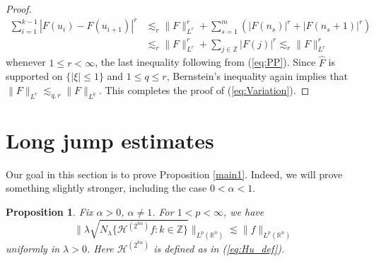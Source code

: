 \documentclass[12pt,leqno]{amsart}
\def\R{\mathbb{R}}
\def\Z{\mathbb{Z}}
\theoremstyle{plain}
\newtheorem{prop}[thm]{Proposition}
\numberwithin{equation}{section}
\begin{document}
\begin{proof}
\begin{align*}
\sum_{i=1}^{k-1} |F(u_i)-F(u_{i+1})|^r 
&\lesssim_r \|F\|_{L^r}^r + \sum_{s = 1}^m \left( |F(n_s)|^r + |F(n_s+1)|^r \right)  \\
&\lesssim_r \|F\|_{L^r}^r + \sum_{j \in \Z} |F(j)|^r \lesssim_r \|F\|_{L^r}^r
\end{align*}
whenever $1 \leq r < \infty$, the last inequality following from (\ref{eq:PP}). Since $\widehat{F}$ is supported on $\{|\xi| \leq 1\}$ and $1 \leq q \leq r$, Bernstein's inequality again implies that $\|F\|_{L^r} \lesssim_{q,r} \|F\|_{L^q}$. This completes the proof of (\ref{eq:Variation}). 
\end{proof}





\section{Long jump estimates}\label{section:long-jumps}

Our goal in this section is to prove Proposition \ref{main1}. Indeed, we will prove something slightly stronger, including the case $0<\alpha<1$.

\begin{prop}
Fix $\alpha > 0$, $\alpha \ne 1$. For $1 < p < \infty$, we have
\begin{equation} \label{eq:Hk_jump}
\| \lambda \sqrt{N_{\lambda} \{\mathcal{H}^{(2^{k\alpha})} f \colon k \in \Z\} } \|_{L^p(\R^n)} \lesssim \|f\|_{L^p(\R^n)}
\end{equation}
uniformly in $\lambda > 0$. Here $\mathcal{H}^{(2^{k\alpha})}$ is defined as in (\ref{eq:Hu_def}).
\end{prop} 
\end{document}
